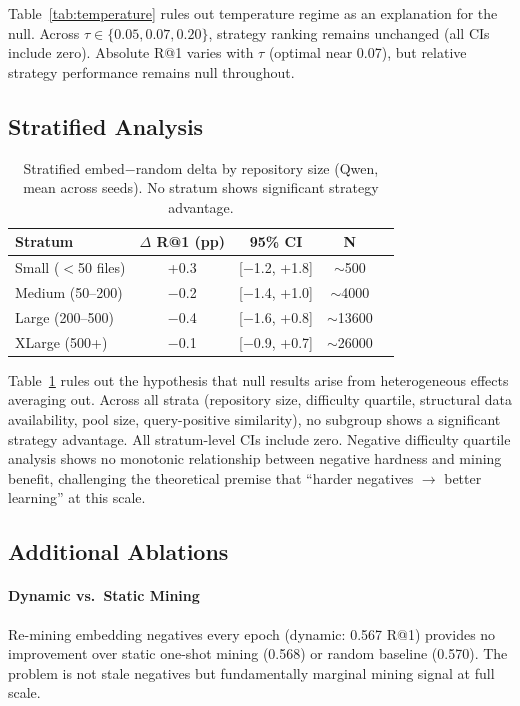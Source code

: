 \documentclass[11pt,a4paper]{article}
\begin{document}
Table~\ref{tab:temperature} rules out temperature regime as an explanation for the null.
Across $\tau \in \{0.05, 0.07, 0.20\}$, strategy ranking remains unchanged (all CIs include zero).
Absolute R@1 varies with $\tau$ (optimal near 0.07), but relative strategy performance remains null throughout.

\subsection{Stratified Analysis}

\begin{table}[t]
\centering
\small
\begin{tabular}{lcccc}
\toprule
Stratum & $\Delta$ R@1 (pp) & 95\% CI & N \\
\midrule
Small ($<$50 files) & +0.3 & [$-$1.2, +1.8] & $\sim$500 \\
Medium (50--200) & $-$0.2 & [$-$1.4, +1.0] & $\sim$4000 \\
Large (200--500) & $-$0.4 & [$-$1.6, +0.8] & $\sim$13600 \\
XLarge (500+) & $-$0.1 & [$-$0.9, +0.7] & $\sim$26000 \\
\bottomrule
\end{tabular}
\caption{Stratified embed$-$random delta by repository size (Qwen, mean across seeds). No stratum shows significant strategy advantage.}
\label{tab:stratified}
\end{table}

Table~\ref{tab:stratified} rules out the hypothesis that null results arise from heterogeneous effects averaging out.
Across all strata (repository size, difficulty quartile, structural data availability, pool size, query-positive similarity), no subgroup shows a significant strategy advantage.
All stratum-level CIs include zero.
Negative difficulty quartile analysis shows no monotonic relationship between negative hardness and mining benefit, challenging the theoretical premise that ``harder negatives $\to$ better learning'' at this scale.

\subsection{Additional Ablations}

\paragraph{Dynamic vs.\ Static Mining}
Re-mining embedding negatives every epoch (dynamic: 0.567 R@1) provides no improvement over static one-shot mining (0.568) or random baseline (0.570).
The problem is not stale negatives but fundamentally marginal mining signal at full scale.
\end{document}

